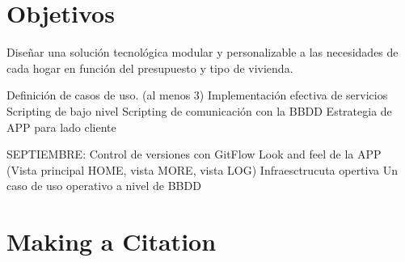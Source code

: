 \section{Objetivos}
\label{makereference1.2}

Diseñar una solución tecnológica modular y personalizable a las necesidades de cada hogar en función del presupuesto y tipo de vivienda. 

Definición de casos de uso. (al menos 3)
Implementación efectiva de servicios
Scripting de bajo nivel
Scripting de comunicación con la BBDD	
Estrategia de APP para lado cliente

SEPTIEMBRE:
Control de versiones con GitFlow
Look and feel de la APP (Vista principal HOME, vista MORE, vista LOG)
Infraesctrucuta opertiva
Un caso de uso operativo a nivel de BBDD


\section{Making a Citation}
\label{makereference1.3}